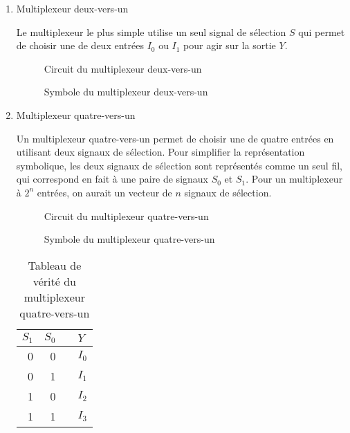 \documentclass[letter, oneside]{book}
\begin{document}
\begin{enumerate}
\item Multiplexeur deux-vers-un
\label{sec:orgd839eaa}

Le multiplexeur le plus simple utilise un seul signal de sélection
\(S\) qui permet de choisir une de deux entrées \(I_0\) ou \(I_1\)
pour agir sur la sortie \(Y\).

\begin{figure}[htbp]
\centering

\caption{\label{fig:orgc81660f}Circuit du multiplexeur deux-vers-un}
\end{figure}

\begin{figure}[htbp]
\centering

\caption{\label{fig:org3fe8160}Symbole du multiplexeur deux-vers-un}
\end{figure}

\item Multiplexeur quatre-vers-un
\label{sec:orgacbad6c}

Un multiplexeur quatre-vers-un permet de choisir une de quatre entrées
en utilisant deux signaux de sélection. Pour simplifier la
représentation symbolique, les deux signaux de sélection sont
représentés comme un seul fil, qui correspond en fait à une paire de
signaux \(S_0\) et \(S_1\). Pour un multiplexeur à \(2^n\) entrées, on
aurait un vecteur de \(n\) signaux de sélection.

\begin{figure}[htbp]
\centering

\caption{\label{fig:org387cc11}Circuit du multiplexeur quatre-vers-un}
\end{figure}

\begin{figure}[htbp]
\centering

\caption{\label{fig:orgbee2c84}Symbole du multiplexeur quatre-vers-un}
\end{figure}

\begin{table}[htbp]
\caption{\label{tab:org1041bb4}Tableau de vérité du multiplexeur quatre-vers-un}
\centering
\begin{tabular}{rrll}
\(S_1\) & \(S_0\) &  & \(Y\)\\[0pt]
\hline
0 & 0 &  & \(I_0\)\\[0pt]
0 & 1 &  & \(I_1\)\\[0pt]
1 & 0 &  & \(I_2\)\\[0pt]
1 & 1 &  & \(I_3\)\\[0pt]
\end{tabular}
\end{table}
\end{enumerate}
\end{document}
